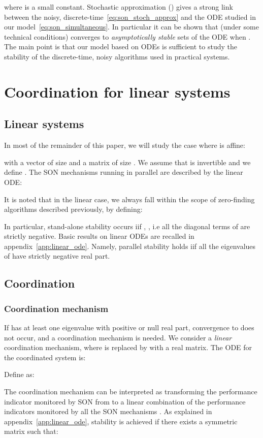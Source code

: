 \documentclass[10pt,conference,letterpaper]{IEEEtran}
\begin{document}
where  is a small constant.	Stochastic approximation (\cite{Kushner,Borkar}) gives a strong link between the noisy, discrete-time~\eqref{eq:son_stoch_approx} and the \ac{ODE} studied in our model~\eqref{eq:son_simultaneous}. In particular it can be shown that (under some technical conditions)  converges to \emph{asymptotically stable} sets of the \ac{ODE} when . The main point is that our model based on \acp{ODE} is sufficient to study the stability of the discrete-time, noisy algorithms used in practical systems. 

\section{Coordination for linear systems}\label{sec:linear_case}
\subsection{Linear systems}
		In most of the remainder of this paper, we will study the case where  is affine:

with  a vector of size  and  a matrix of size . We assume that  is invertible and we define . The \ac{SON} mechanisms running in parallel are described by the linear \ac{ODE}:

	It is noted that in the linear case, we always fall within the scope of zero-finding algorithms described previously, by defining:

	In particular, stand-alone stability occurs iif  , , i.e all the diagonal terms of  are strictly negative. Basic results on linear \acp{ODE} are recalled in appendix~\ref{app:linear_ode}. Namely, parallel stability holds iif all the eigenvalues of  have strictly negative real part.

\subsection{Coordination}
\subsubsection{Coordination mechanism}
	If  has at least one eigenvalue with positive or null real part, convergence to  does not occur, and a coordination mechanism is needed. We consider a \emph{linear} coordination mechanism, where  is replaced by  with  a  real matrix. The \ac{ODE} for the coordinated system is:

	 Define  as:

	The coordination mechanism can be interpreted as transforming the performance indicator monitored by \ac{SON}  from  to a linear combination of the performance indicators monitored by all the \ac{SON} mechanisms . As explained in appendix~\ref{app:linear_ode}, stability is achieved if there exists a symmetric matrix   such that:
\end{document}
